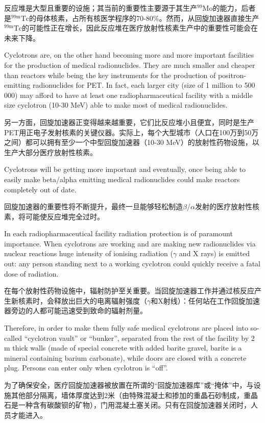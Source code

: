 \documentclass[dvipsnames, svgnames,a4paper,11pt]{article}
\begin{document}
反应堆是大型且重要的设施；其当前的重要性主要源于其生产${}^{99}\mathrm{Mo}$的能力，后者是${}^\mathrm{99m}\mathrm{Tc}$的母体核素，占所有核医学程序的70-80\%。然而，从回旋加速器直接生产${}^\mathrm{99m}\mathrm{Tc}$的可能性正在增长，因此反应堆在医疗放射性核素生产中的重要性可能会在未来下降。

Cyclotrons are, on the other hand becoming
more and more important facilities for the
production of medical radionuclides. They are
much smaller and cheaper than reactors while
being the key instruments for the production of
positron-emitting radionuclides for PET. In fact,
each larger city (size of 1 million to 500 000) may
afford to have at least one radiopharmaceutical
facility with a middle size cyclotron (10-30 MeV)
able to make most of medical radionuclides.

另一方面，回旋加速器正变得越来越重要，它们比反应堆小且便宜，同时是生产PET用正电子发射核素的关键仪器。实际上，每个大型城市（人口在100万到50万之间）都可以拥有至少一个中型回旋加速器（10-30 MeV）的放射性药物设施，以生产大部分医疗放射性核素。



Cyclotrons will be getting more important and
eventually, once being able to easily make
beta/alpha emitting medical radionuclides could
make reactors completely out of date.

回旋加速器的重要性将不断提升，最终一旦能够轻松制造$\beta$/$\alpha$发射的医疗放射性核素，将可能使反应堆完全过时。


In each radiopharmaceutical facility radiation
protection is of paramount importance. When
cyclotrons are working and are making new
radionuclides via nuclear reactions huge intensity
of ionising radiation ($\gamma$ and X rays) is emitted out: any person standing next to a
working cyclotron could quickly receive a fatal dose of radiation.

在每个放射性药物设施中，辐射防护至关重要。当回旋加速器工作并通过核反应产生新核素时，会释放出巨大的电离辐射强度（$\gamma$和X射线）：任何站在工作回旋加速器旁边的人都可能迅速受到致命的辐射剂量。

Therefore, in order to make them fully safe medical cyclotrons are placed into so-
called “cyclotron vault” or “bunker”, separated from the rest of the facility by 2 m thick
walls (made of special concrete with added barite gravel, barite is a mineral
containing barium carbonate), while doors are closed with a concrete plug. Persons
can enter only when cyclotron is “off”.

为了确保安全，医疗回旋加速器被放置在所谓的“回旋加速器库”或“掩体”中，与设施其他部分隔离，墙体厚度达到2米（由特殊混凝土和掺加的重晶石砂制成，重晶石是一种含有碳酸钡的矿物），门用混凝土塞关闭。只有在回旋加速器关闭时，人员才能进入。
\end{document}
